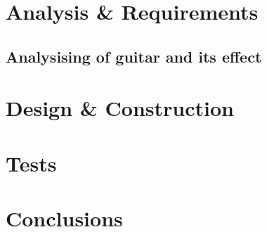 %
\part{Analysis \& Requirements}\label{pt:analysis} \glsresetall
 \graphicspath{{figures/analysing/}}
 \chapter{Analysising of guitar and its effect}\label{ch:analysing}
 \label{sec:electric_guitar_theory} 
 \label{sec:effects}
\label{sec:platform_comparing}

 \label{sec:FPGA}

\part{Design \& Construction}\label{pt:design} 
 
%
\part{Tests}\label{pt:tests} 
\part{Conclusions}\label{pt:conclusions} 
%

